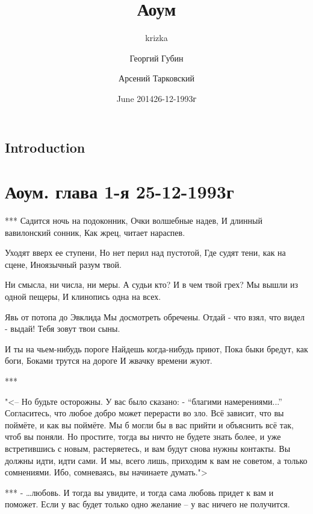 \documentclass{extbook}
\title{Аоум}
\author{krizka}
\date{June 2014}
\newcommand{\soul}[1]{{#1}}
\begin{document}
\maketitle

\section{Introduction}

\chapter{Аоум. глава 1-я 25-12-1993г}
\author{Георгий Губин}
 ***
 Садится ночь на подоконник,
 Очки волшебные надев,
 И длинный вавилонский сонник,
 Как жрец, читает нараспев.

Уходят вверх ее ступени,
 Но нет перил над пустотой,
 Где судят тени, как на сцене,
 Иноязычный разум твой.

Ни смысла, ни числа, ни меры.
 А судьи кто? И в чем твой грех?
 Мы вышли из одной пещеры,
 И клинопись одна на всех.

Явь от потопа до Эвклида
 Мы досмотреть обречены.
 Отдай - что взял, 
 что видел - выдай!
 Тебя зовут твои сыны.

И ты на чьем-нибудь пороге
 Найдешь когда-нибудь приют,
 Пока быки бредут, как боги,
 Боками трутся на дороге
 И жвачку времени жуют.

\author{Арсений Тарковский}


\date{26-12-1993г}

***

\soul{"<– Но будьте осторожны. У вас было сказано: - ``благими намерениями...'' Согласитесь, что любое добро может перерасти во зло. Всё зависит, что вы поймёте, и как вы поймёте. Мы б могли бы  в вас прийти и объяснить всё так, чтоб вы поняли. Но простите, тогда вы ничто не будете знать более, и уже встретившись с новым, растеряетесь, и вам будут снова нужны контакты. Вы должны идти, идти сами. И мы, всего лишь, приходим к вам не советом, а только сомнениями. Ибо, сомневаясь, вы начинаете думать.">}

***
\soul{ - …любовь. И тогда вы увидите, и тогда сама любовь придет к вам и поможет. Если у вас будет только одно желание –  у вас ничего не получится.}
\end{document}
